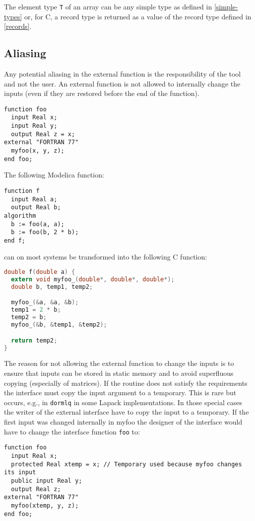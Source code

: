 The element type {\lstinline!T!} of an array can be any simple type as defined in \cref{simple-types} or, for C, a record type is returned as a value of the record type defined in \cref{records}.

\subsection{Aliasing}\label{aliasing}

Any potential aliasing in the external function is the responsibility of the tool and not the user.
An external function is not allowed to internally change the inputs (even if they are restored before the end of the function).

\begin{example}
\begin{lstlisting}[language=modelica]
function foo
  input Real x;
  input Real y;
  output Real z = x;
external "FORTRAN 77"
  myfoo(x, y, z);
end foo;
\end{lstlisting}
The following Modelica function:
\begin{lstlisting}[language=modelica]
function f
  input Real a;
  output Real b;
algorithm
  b := foo(a, a);
  b := foo(b, 2 * b);
end f;
\end{lstlisting}
can on most systems be transformed into the following C function:
\begin{lstlisting}[language=C]
double f(double a) {
  extern void myfoo_(double*, double*, double*);
  double b, temp1, temp2;

  myfoo_(&a, &a, &b);
  temp1 = 2 * b;
  temp2 = b;
  myfoo_(&b, &temp1, &temp2);

  return temp2;
}
\end{lstlisting}

The reason for not allowing the external function to change the inputs is to ensure that inputs can be stored in static memory and to avoid superfluous copying (especially of matrices).
If the routine does not satisfy the requirements the interface must copy the input argument to a temporary.
This is rare but occurs, e.g., in {\lstinline!dormlq!} in some Lapack implementations.
In those special cases the writer of the external interface have to copy the input to a temporary.
If the first input was changed internally in myfoo the designer of the interface would have to change the interface function {\lstinline!foo!} to:
\begin{lstlisting}[language=modelica]
function foo
  input Real x;
  protected Real xtemp = x; // Temporary used because myfoo changes its input
  public input Real y;
  output Real z;
external "FORTRAN 77"
  myfoo(xtemp, y, z);
end foo;
\end{lstlisting}


\end{example}
